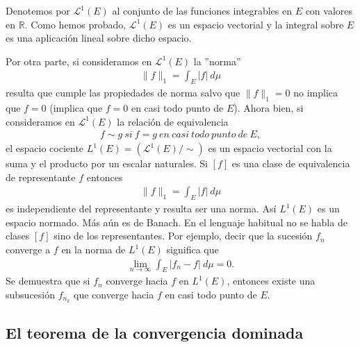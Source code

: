 \begin{obs}
    Denotemos por $\mathcal{L}^1(E)$ al conjunto de las funciones integrables en $E$ con valores en $\mathbb{R}$. Como hemos probado, $\mathcal{L}^1(E)$ es un espacio vectorial y la integral sobre $E$ es una aplicación lineal sobre dicho espacio.

    Por otra parte, si consideramos en $\mathcal{L}^1(E)$ la ''norma''
    \begin{align*}
        \|f\|_1 = \int_{E}{|f| \ d\mu}
    \end{align*}
    resulta que cumple las propiedades de norma salvo que $\|f\|_1 = 0$ no implica que $f = 0$ (implica que $f = 0$ en casi todo punto de $E$). Ahora bien, si consideramos en $\mathcal{L}^1(E)$ la relación de equivalencia
    \begin{align*}
        f \sim g \ si \ f = g \ en \ casi \ todo \ punto \ de \ E,
    \end{align*}
    el espacio cociente $L^1(E) = (\mathcal{L}^1(E)/\sim)$ es un espacio vectorial con la suma y el producto por un escalar naturales. Si $[f]$ es una clase de equivalencia de representante $f$ entonces
    \begin{align*}
        \|f\|_1 = \int_{E}{|f| \ d\mu}
    \end{align*}
    es independiente del representante y resulta ser una norma. Así $L^1(E)$ es un espacio normado. Más aún es de Banach. En el lenguaje habitual no se habla de clases $[f]$ sino de los representantes. Por ejemplo, decir que la sucesión $f_n$ converge a $f$ en la norma de $L^1(E)$ significa que
    \begin{align*}
        \lim_{n \to \infty}{\int_{E}{|f_n - f|} \ d\mu} = 0.
    \end{align*}
    Se demuestra que si $f_n$ converge hacia $f$ en $L^1(E)$, entonces existe una subsucesión $f_{n_k}$ que converge hacia $f$ en casi todo punto de $E$.
\end{obs}

\subsection{El teorema de la convergencia dominada}

